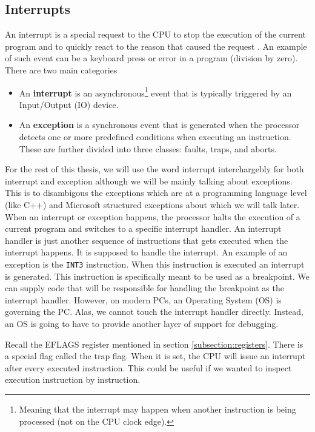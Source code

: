 \subsection{Interrupts}
An interrupt is a special request to the CPU to stop the execution of the
current program and to quickly react to the reason that caused the request
\cite{aps-interrupts}. An example of such event can be a keyboard press or
error in a program (division by zero). There are two main categories
\cite{intel-manual}
\begin{itemize}
    \item An \textbf{interrupt} is an asynchronous\footnote{Meaning that the
        interrupt may happen when another instruction is being processed (not
        on the CPU clock edge).} event that is typically triggered by an
        Input/Output (IO) device.
    \item An \textbf{exception} is a synchronous event that is
        generated when the processor detects one or more predefined conditions
        when executing an instruction. These are further divided into three
        classes: faults, traps, and aborts.
\end{itemize}

For the rest of this thesis, we will use the word interrupt interchargebly for
both interrupt and exception although we will be mainly talking about
exceptions. This is to disambigous the exceptions which are at a programming
language level (like C++) and Microsoft structured exceptions about which we
will talk later. When an interrupt or exception happens, the processor halts
the execution of a current program and switches to a specific interrupt
handler. An interrupt handler is just another sequence of instructions that
gets executed when the interrupt happens. It is supposed to handle the
interrupt. An example of an exception is the \texttt{INT3} instruction. When
this instruction is executed an interrupt is generated. This instruction is
specifically meant to be used as a breakpoint. We can supply code that will be
responsible for handling the breakpoint as the interrupt handler. However, on
modern PCs, an Operating System (OS) is governing the PC. Alas, we cannot touch
the interrupt handler directly. Instead, an OS is going to have to provide
another layer of support for debugging.

Recall the EFLAGS register mentioned in section \ref{subsection:registers}.
There is a special flag called the trap flag. When it is set, the CPU will
issue an interrupt after every executed instruction. This could be useful if we
wanted to inspect execution instruction by instruction.

